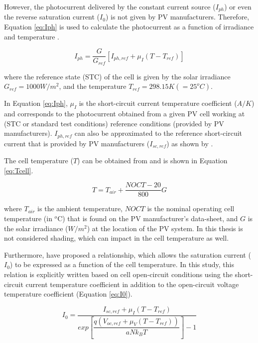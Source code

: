 However, the photocurrent delivered by the constant current source ($ I_{ph} $) or even the reverse saturation current ($ I_{0} $) is not given by PV manufacturers. Therefore, Equation \ref{eq:Iph} is used to calculate the photocurrent as a function of irradiance and temperature \cite{Villalva}.

\begin{equation}
\label{eq:Iph}
I_{ph}=\dfrac{G}{G_{ref}} \left[ I_{ph,ref} + \mu_{I} \left( T-T_{ref} \right)    \right] 
\end{equation}

\noindent where the reference state (STC) of the cell is given by the solar irradiance $ G_{ref}=1000 W/m^{2} $, and the temperature $ T_{ref}=298.15 K (=25^{o}C) $.

In Equation \ref{eq:Iph}, $ \mu_{I} $ is the short-circuit current temperature coefficient ($A/K$) and corresponds to the photocurrent obtained from a given PV cell working at (STC or standard test conditions) reference conditions (provided by PV manufacturers). $ I_{ph,ref} $ can also be approximated to the reference short-circuit current that is provided by PV manufacturers ($ I_{sc,ref} $) as shown by \cite{Jakhrani}.

The cell temperature ($ T $) can be obtained from \cite{Ross} and is shown in Equation \ref{eq:Tcell}.

\begin{equation}
\label{eq:Tcell}
T = T_{air} + \dfrac{NOCT-20}{800}G
\end{equation}

\noindent where $ T_{air} $ is the ambient temperature, $NOCT$ is the nominal operating cell temperature (in $^{o}$C) that is found on the PV manufacturer's data-sheet, and $G$ is the solar irradiance ($ W/m^{2} $) at the location of the PV system. In this thesis is not considered shading, which can impact in the cell temperature as well.

Furthermore, \cite{Villalva} have proposed a relationship, which allows the saturation current ($ I_{0} $) to be expressed as a function of the cell temperature. In this study, this relation is explicitly written based on cell open-circuit conditions using the short-circuit current temperature coefficient in addition to the open-circuit voltage temperature coefficient (Equation \ref{eq:I0}).

\begin{equation}
\label{eq:I0}
I_{0} = \dfrac{I_{sc,ref} + \mu_{I}(T - T_{ref})}{exp \left[ \dfrac{q(V_{oc,ref} + \mu_{V} (T - T_{ref}))}{aNk_{B}T}    \right] -1}
\end{equation}

